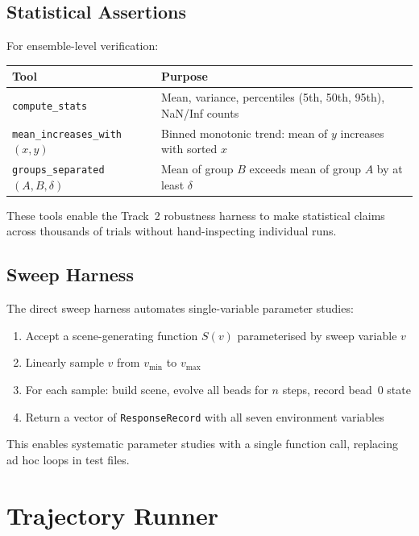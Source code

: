 \documentclass[11pt]{article}
\newcommand{\type}[1]{\texttt{#1}}
\newcommand{\fn}[1]{\texttt{#1}}
\begin{document}
\subsection{Statistical Assertions}

For ensemble-level verification:

\begin{center}
\begin{tabular}{lp{7cm}}
    \textbf{Tool} & \textbf{Purpose} \\
    \midrule
    \fn{compute\_stats}
        & Mean, variance, percentiles (5th, 50th, 95th), NaN/Inf counts \\
    \fn{mean\_increases\_with}$(x, y)$
        & Binned monotonic trend: mean of $y$ increases with sorted $x$ \\
    \fn{groups\_separated}$(A, B, \delta)$
        & Mean of group $B$ exceeds mean of group $A$ by at least $\delta$ \\
\end{tabular}
\end{center}

These tools enable the Track~2 robustness harness to make statistical
claims across thousands of trials without hand-inspecting individual runs.

\subsection{Sweep Harness}

The direct sweep harness automates single-variable parameter studies:

\begin{enumerate}
    \item Accept a scene-generating function $S(v)$ parameterised by
          sweep variable $v$
    \item Linearly sample $v$ from $v_{\min}$ to $v_{\max}$
    \item For each sample: build scene, evolve all beads for $n$ steps,
          record bead~0 state
    \item Return a vector of \type{ResponseRecord} with all seven
          environment variables
\end{enumerate}

This enables systematic parameter studies with a single function call,
replacing ad hoc loops in test files.

\section{Trajectory Runner}
\label{sec:runner}
\end{document}
